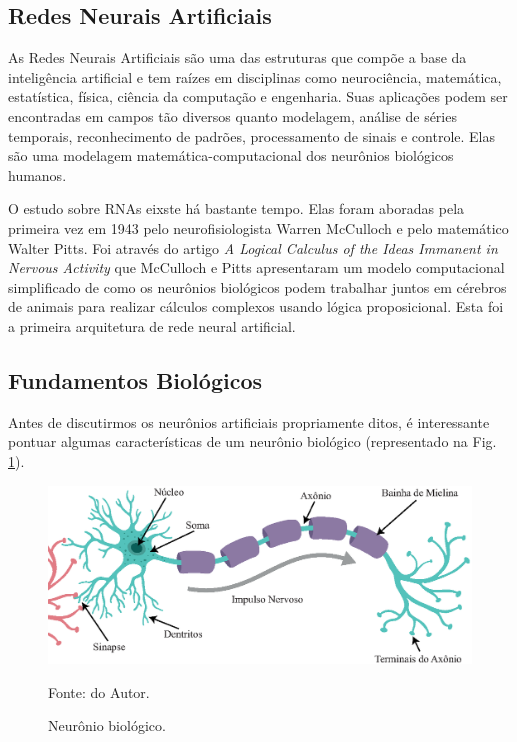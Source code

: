 \subsection{Redes Neurais Artificiais}

As Redes Neurais Artificiais são uma das estruturas que compõe a base da inteligência artificial e tem raízes em disciplinas como neurociência, matemática, estatística, física, ciência da computação e engenharia. Suas aplicações podem ser encontradas em campos tão diversos quanto modelagem, análise de séries temporais, reconhecimento de padrões, processamento de sinais e controle. Elas são uma modelagem matemática-computacional dos neurônios biológicos humanos. 

O estudo sobre RNAs eixste há bastante tempo. Elas foram aboradas pela primeira vez em 1943 pelo neurofisiologista Warren McCulloch e pelo matemático Walter Pitts. Foi através do artigo \textit{A Logical Calculus of the Ideas Immanent in Nervous Activity} \cite{mcculloch1943logical} que McCulloch e Pitts apresentaram um modelo computacional simplificado de como os neurônios biológicos podem trabalhar juntos em cérebros de animais para realizar cálculos complexos usando lógica proposicional. Esta foi a primeira arquitetura de rede neural artificial.


\subsection{Fundamentos Biológicos}

Antes de discutirmos os neurônios artificiais propriamente ditos, é interessante pontuar algumas características de um neurônio biológico (representado na Fig. \ref{fig: Neuron}).

\begin{figure}[H]
    \centering
    \includegraphics[width=\textwidth]{04-Figuras/Neuron.eps}
    \caption{Neurônio biológico.} \par
    Fonte: do Autor.
    \label{fig: Neuron}
\end{figure}

